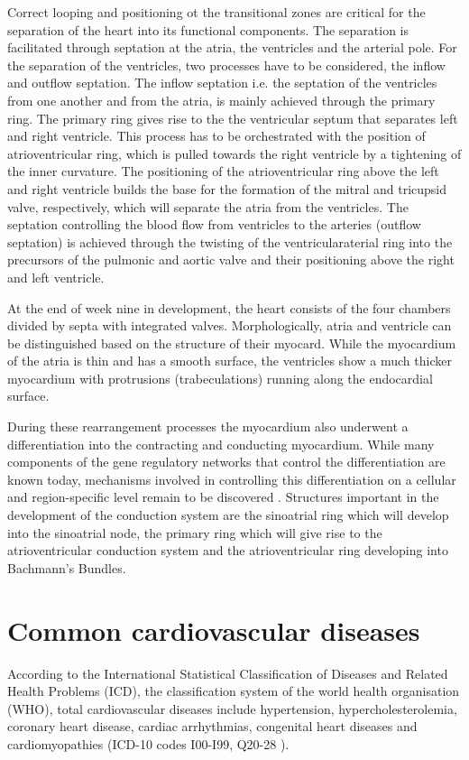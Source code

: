 Correct looping and positioning ot the transitional zones are critical for the separation of the heart into its functional components. The separation is facilitated through septation at the atria, the ventricles and the arterial pole. For the separation of the ventricles, two processes have to be considered, the inflow and outflow septation. The inflow septation i.e. the septation of the ventricles from one another and from the atria, is mainly achieved through the primary ring. The primary ring gives rise to the the ventricular septum that separates left and right ventricle. This process has to be orchestrated with the position of atrioventricular ring, which is pulled towards the right ventricle by a tightening of the inner curvature. The positioning of the atrioventricular ring above the left and right ventricle builds the base for the formation of the mitral and tricupsid valve, respectively, which will separate the atria from the ventricles.  The septation controlling the blood flow from ventricles to the arteries (outflow septation) is achieved through the twisting of the ventricularaterial ring into the precursors of the pulmonic and aortic valve and their positioning above the right and left ventricle.  

At the end of week nine in development, the heart consists of the four chambers divided by septa with integrated valves. Morphologically, atria and ventricle can be distinguished based on the structure of their myocard. While the myocardium of the atria is thin and has a smooth surface, the ventricles show a much thicker myocardium with protrusions (trabeculations) running along the endocardial surface. 

During these rearrangement processes the myocardium also underwent a differentiation into the contracting and conducting myocardium. While many components of the gene regulatory networks that control the differentiation are known today,  mechanisms involved in controlling this differentiation on a cellular and region-specific level remain to be discovered \citep{Christoffels2009,Paige2015,Park2017}. Structures important in the development of the conduction system are the sinoatrial ring which will develop into the sinoatrial node, the primary ring which will give rise to the atrioventricular conduction system and the atrioventricular ring developing into Bachmann's Bundles. 

\section{Common cardiovascular diseases}
\label{subsection:CVD}
According to the International Statistical Classification of Diseases and Related Health Problems (ICD), the classification system of the world health organisation (WHO), total cardiovascular diseases include hypertension, hypercholesterolemia, coronary heart disease, cardiac arrhythmias, congenital heart diseases and cardiomyopathies (ICD-10 codes I00-I99, Q20-28 \citep{WHO2016}). 

